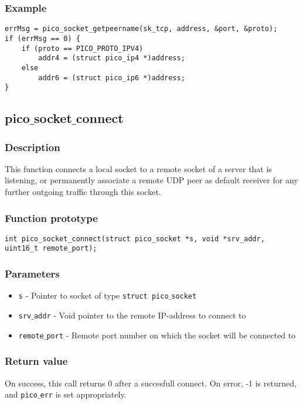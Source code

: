 \subsubsection*{Example}
\begin{verbatim}
errMsg = pico_socket_getpeername(sk_tcp, address, &port, &proto);
if (errMsg == 0) {
    if (proto == PICO_PROTO_IPV4)
        addr4 = (struct pico_ip4 *)address;
    else
        addr6 = (struct pico_ip6 *)address;
}
\end{verbatim}


\subsection{pico$\_$socket$\_$connect}

\subsubsection*{Description}
This function connects a local socket to a remote socket of a server that is listening, or permanently associate a remote UDP peer as default receiver for any further outgoing traffic through this socket.

\subsubsection*{Function prototype}
\begin{verbatim}
int pico_socket_connect(struct pico_socket *s, void *srv_addr,
uint16_t remote_port);
\end{verbatim}


\subsubsection*{Parameters}
\begin{itemize}[noitemsep]
\item \texttt{s} - Pointer to socket of type \texttt{struct pico$\_$socket}
\item \texttt{srv$\_$addr} - Void pointer to the remote IP-address to connect to
\item \texttt{remote$\_$port} - Remote port number on which the socket will be connected to
\end{itemize} 

\subsubsection*{Return value}
On success, this call returns 0 after a succesfull connect.
On error, -1 is returned, and \texttt{pico$\_$err} is set appropriately.

